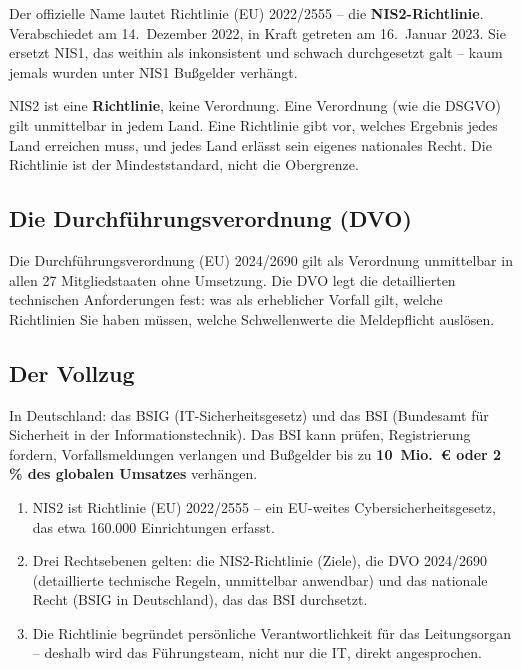 \documentclass[11pt,a4paper,twoside]{book}
\begin{document}
Der offizielle Name lautet Richtlinie (EU) 2022/2555 -- die \textbf{NIS2-Richtlinie}. Verabschiedet am 14.~Dezember 2022, in Kraft getreten am 16.~Januar 2023. Sie ersetzt NIS1, das weithin als inkonsistent und schwach durchgesetzt galt -- kaum jemals wurden unter NIS1 Bußgelder verhängt.

NIS2 ist eine \textbf{Richtlinie}, keine Verordnung. Eine Verordnung (wie die DSGVO) gilt unmittelbar in jedem Land. Eine Richtlinie gibt vor, welches Ergebnis jedes Land erreichen muss, und jedes Land erlässt sein eigenes nationales Recht. Die Richtlinie ist der Mindeststandard, nicht die Obergrenze.

\subsection*{Die Durchführungsverordnung (DVO)}

Die Durchführungsverordnung (EU) 2024/2690 gilt als Verordnung unmittelbar in allen 27 Mitgliedstaaten ohne Umsetzung. Die DVO legt die detaillierten technischen Anforderungen fest: was als erheblicher Vorfall gilt, welche Richtlinien Sie haben müssen, welche Schwellenwerte die Meldepflicht auslösen.

\subsection*{Der Vollzug}

In Deutschland: das BSIG (IT-Sicherheitsgesetz) und das BSI (Bundesamt für Sicherheit in der Informationstechnik). Das BSI kann prüfen, Registrierung fordern, Vorfallsmeldungen verlangen und Bußgelder bis zu \textbf{10~Mio.~\euro{} oder 2\,\% des globalen Umsatzes} verhängen.

\begin{keytakeaways}
\begin{enumerate}
  \item NIS2 ist Richtlinie (EU) 2022/2555 -- ein EU-weites Cybersicherheitsgesetz, das etwa 160.000 Einrichtungen erfasst.
  \item Drei Rechtsebenen gelten: die NIS2-Richtlinie (Ziele), die DVO 2024/2690 (detaillierte technische Regeln, unmittelbar anwendbar) und das nationale Recht (BSIG in Deutschland), das das BSI durchsetzt.
  \item Die Richtlinie begründet persönliche Verantwortlichkeit für das Leitungsorgan -- deshalb wird das Führungsteam, nicht nur die IT, direkt angesprochen.
\end{enumerate}
\end{keytakeaways}
\end{document}
